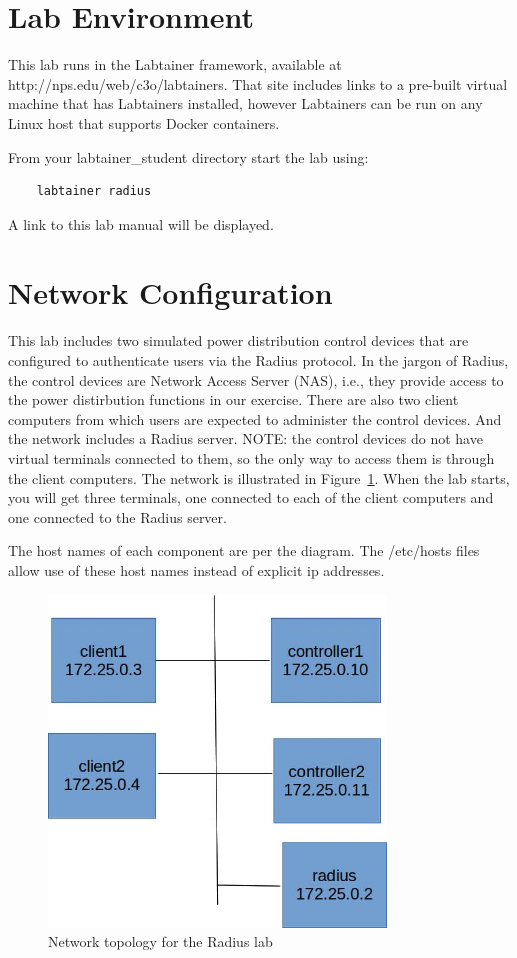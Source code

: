 \section{Lab Environment}
This lab runs in the Labtainer framework,
available at http://nps.edu/web/c3o/labtainers.
That site includes links to a pre-built virtual machine
that has Labtainers installed, however Labtainers can
be run on any Linux host that supports Docker containers.

From your labtainer_student directory start the lab using:
\begin{verbatim}
    labtainer radius
\end{verbatim}
\noindent A link to this lab manual will be displayed.  

\section{Network Configuration}
This lab includes two simulated power distribution control devices that
are configured to authenticate users via the Radius protocol.  In the jargon
of Radius, the control devices are Network Access Server (NAS), i.e., they
provide access to the power distirbution functions in our exercise. There
are also two client computers from which users are expected to administer
the control devices.  
And the network includes a Radius server.  NOTE: the control devices
do not have virtual terminals connected to them, so the only way to 
access them is through the client computers.  The network is
illustrated in Figure~\ref{fig:topology}.
When the lab starts, you will get three terminals, one connected to each
of the client computers and one connected to the Radius server.

The host names of each component are per the diagram.  The /etc/hosts files
allow use of these host names instead of explicit ip addresses.

\begin{figure}[H]
\begin{center}
\includegraphics [width=0.8\textwidth]{radius.jpg}
\end{center}
\caption{Network topology for the Radius lab}
\label{fig:topology}
\end{figure}

